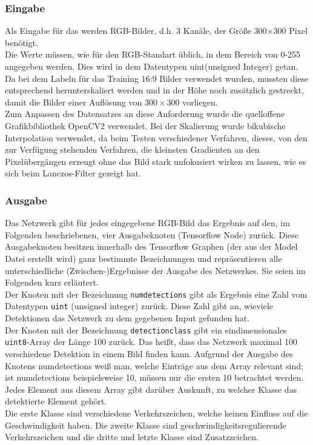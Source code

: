 \documentclass[12pt,a4paper,ngerman,enabledeprecatedfontcommands]{scrreprt}
\begin{document}
\subsubsection{Eingabe}
Als Eingabe für das  werden RGB-Bilder, d.h. 3 Kanäle, der Größe 300$\times$300 Pixel benötigt.\\
Die Werte müssen, wie für den RGB-Standart üblich, in dem Bereich von 0-255 angegeben werden.
Dies wird in dem Datentypen uint(unsigned Integer) getan.
Da bei dem Labeln für das Training 16:9 Bilder verwendet wurden, mussten diese entsprechend herunterskaliert werden und in der Höhe noch zusätzlich gestreckt, damit die Bilder einer Auflösung von $300\times300$ vorliegen.\\
Zum Anpassen des Datensatzes an diese Anforderung wurde die quelloffene Grafikbibliothek \gls{OpenCV2} verwendet.
Bei der Skalierung wurde bikubische Interpolation verwendet, da beim Testen verschiedener Verfahren, dieses, von den zur Verfügung stehenden Verfahren, die kleinsten Gradienten an den Pixelübergängen erzeugt ohne das Bild stark unfokusiert wirken zu lassen, wie es sich beim Lanczos-Filter gezeigt hat.\\

\subsubsection{Ausgabe}
Das Netzwerk gibt für jedes eingegebene RGB-Bild das Ergebnis auf den, im Folgenden beschriebenen, vier Ausgabeknoten (\gls{Tensorflow Node}) zurück. Diese Ausgabeknoten besitzen innerhalb des Tensorflow Graphen (der aus der Model Datei erstellt wird) ganz bestimmte Bezeichnungen und repräsentieren alle unterschiedliche (Zwischen-)Ergebnisse der Ausgabe des Netzwerkes. Sie seien im Folgenden kurz erläutert.\\

Der Knoten mit der Bezeichnung \texttt{num\textunderscore detections} gibt als Ergebnis eine Zahl vom Datentypen \texttt{uint} (unsigned integer) zurück.
Diese Zahl gibt an, wieviele Detektionen das Netzwerk zu dem gegebenen Input gefunden hat. \\

Der Knoten mit der Bezeichnung \texttt{detection\textunderscore class} gibt ein eindimensionales \texttt{uint8}-Array der Länge 100 zurück. Das heißt, dass das Netzwerk maximal 100 verschiedene Detektion in einem Bild finden kann. Aufgrund der Ausgabe des Knotens  num\textunderscore detections weiß man, welche Einträge aus dem Array relevant sind; ist  num\textunderscore detections beispielsweise 10, müssen nur die ersten 10 betrachtet werden.
Jedes Element aus diesem Array gibt darüber Auskunft, zu welcher Klasse das detektierte Element gehört.\\
Die erste Klasse sind verschiedene Verkehrszeichen, welche keinen Einfluss auf die Geschwindigkeit haben. Die zweite Klasse sind geschwindigkeitsregulierende Verkehrszeichen und die dritte und letzte Klasse sind Zusatzzeichen.\\
\end{document}
